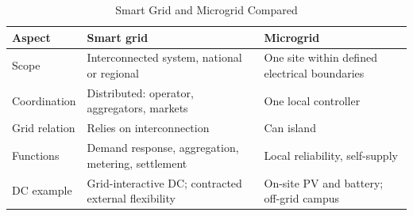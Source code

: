 \documentclass[conference]{IEEEtran}
\begin{document}
\begin{table}[!t]
\caption{Smart Grid and Microgrid Compared}
\label{tab:sgmg}
\centering
\scriptsize
\begin{tabularx}{\columnwidth}{@{}L{14mm}YY@{}}
\toprule
Aspect & Smart grid & Microgrid \\
\midrule
Scope & Interconnected system, national or regional & One site within defined electrical boundaries \\
Coordination & Distributed: operator, aggregators, markets & One local controller \\
Grid relation & Relies on interconnection & Can island \\
Functions & Demand response, aggregation, metering, settlement & Local reliability, self-supply \\
DC example & Grid-interactive DC; contracted external flexibility & On-site PV and battery; off-grid campus \\
\bottomrule
\end{tabularx}
\end{table}
\end{document}
